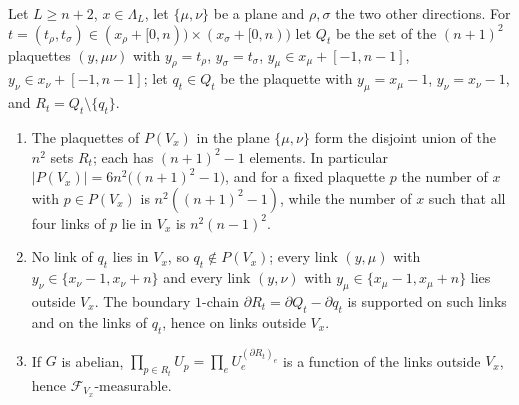 \begin{lemma}[layers]\label{rD:layer}
Let $L\ge n+2$, $x\in\Lambda_L$, let $\{\mu,\nu\}$ be a plane and
$\rho,\sigma$ the two other directions. For $t=(t_\rho,t_\sigma)\in
(x_\rho+[0,n))\times(x_\sigma+[0,n))$ let $Q_t$ be the set of the
$(n+1)^2$ plaquettes $(y,\mu\nu)$ with $y_\rho=t_\rho$, $y_\sigma=t_\sigma$,
$y_\mu\in x_\mu+[-1,n-1]$, $y_\nu\in x_\nu+[-1,n-1]$; let $q_t\in Q_t$ be
the plaquette with $y_\mu=x_\mu-1$, $y_\nu=x_\nu-1$, and $R_t=Q_t\setminus
\{q_t\}$.
\begin{enumerate}[label=\textup{(\roman*)},leftmargin=*]
\item The plaquettes of $P(V_x)$ in the plane $\{\mu,\nu\}$ form the
disjoint union of the $n^2$ sets $R_t$; each has $(n+1)^2-1$ elements. In
particular $\lvert P(V_x)\rvert=6n^2\bigl((n+1)^2-1\bigr)$, and for a fixed
plaquette $p$ the number of $x$ with $p\in P(V_x)$ is $n^2((n+1)^2-1)$,
while the number of $x$ such that all four links of $p$ lie in $V_x$ is
$n^2(n-1)^2$.
\item No link of $q_t$ lies in $V_x$, so $q_t\notin P(V_x)$; every link
$(y,\mu)$ with $y_\nu\in\{x_\nu-1,x_\nu+n\}$ and every link $(y,\nu)$ with
$y_\mu\in\{x_\mu-1,x_\mu+n\}$ lies outside $V_x$. The boundary $1$-chain
$\partial R_t=\partial Q_t-\partial q_t$ is supported on such links and on
the links of $q_t$, hence on links outside $V_x$.
\item If $G$ is abelian, $\prod_{p\in R_t}U_p=\prod_{e}U_e^{(\partial
R_t)_e}$ is a function of the links outside $V_x$, hence
$\mathcal F_{V_x}$-measurable.
\end{enumerate}
\end{lemma}

